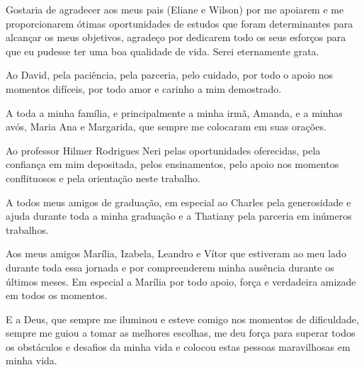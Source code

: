 \begin{agradecimentos}

Gostaria de agradecer aos meus pais (Eliane e Wilson) por me apoiarem e me proporcionarem ótimas oportunidades
de estudos que foram determinantes para alcançar os meus objetivos,  agradeço por dedicarem todo os seus esforços para que eu pudesse ter uma boa qualidade de vida.
Serei eternamente grata.

Ao David, pela paciência, pela parceria, pelo cuidado, por todo o apoio nos momentos difíceis, por todo amor e carinho a mim demostrado.

A toda a minha família, e principalmente a minha irmã, Amanda, e a minhas avós, Maria Ana e Margarida, que sempre me colocaram em suas orações.

Ao professor Hilmer Rodrigues Neri pelas oportunidades oferecidas, pela confiança em mim depositada, pelos ensinamentos, pelo apoio nos momentos conflituosos e pela orientação neste trabalho.

A todos meus amigos de graduação, em especial ao Charles pela generosidade e ajuda durante toda a minha graduação e a Thatiany pela parceria em inúmeros trabalhos.

Aos meus amigos Marília, Izabela, Leandro e Vítor que estiveram ao meu lado durante toda essa jornada e por compreenderem minha ausência durante os últimos meses. Em especial a Marília por todo apoio, força e verdadeira amizade em todos os momentos.

E a Deus, que sempre me iluminou e esteve comigo nos momentos de dificuldade, sempre me guiou a tomar as melhores escolhas, me deu força para superar todos os obstáculos e 
desafios da minha vida e colocou estas pessoas maravilhosas em minha vida.

\end{agradecimentos}
